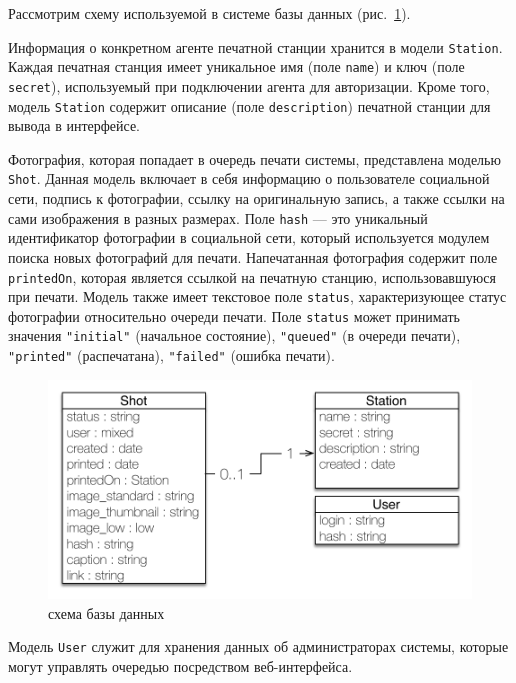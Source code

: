 \documentclass[a4paper,14pt,href,draft]{article}
\begin{document}
Рассмотрим схему используемой в системе базы данных (рис.~\ref{fig:DataModel}).

Информация о конкретном агенте печатной станции хранится в модели \texttt{Station}. Каждая печатная станция имеет
уникальное имя (поле \texttt{name}) и ключ (поле \texttt{secret}), используемый при подключении агента для авторизации.
Кроме того, модель \texttt{Station} содержит описание (поле \texttt{description}) печатной станции для вывода в интерфейсе.

Фотография, которая попадает в очередь печати системы, представлена моделью \texttt{Shot}. Данная модель включает в себя
информацию о пользователе социальной сети, подпись к фотографии, ссылку на оригинальную запись, а также ссылки на сами
изображения в разных размерах. Поле \texttt{hash} --- это уникальный идентификатор фотографии в социальной сети, который
используется модулем поиска новых фотографий для печати. Напечатанная фотография содержит поле \texttt{printedOn}, которая
является ссылкой на печатную станцию, использовавшуюся при печати. Модель также имеет текстовое поле \texttt{status},
характеризующее статус фотографии относительно очереди печати. Поле \texttt{status} может принимать  значения
\texttt{"initial"} (начальное состояние), \texttt{"queued"} (в очереди печати), \texttt{"printed"} (распечатана), \texttt{"failed"}
(ошибка печати).

\begin{figure}[htbp]
\begin{center}
  \includegraphics[scale=0.8]{data-model-uml.pdf}
    \caption{схема базы данных}
    \label{fig:DataModel}
\end{center}
\end{figure}

Модель \texttt{User} служит для хранения данных об администраторах системы, которые могут управлять очередью посредством
веб-интерфейса.
\end{document}

